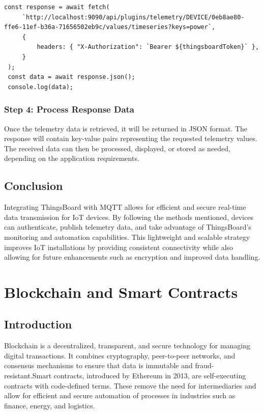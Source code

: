\documentclass[a4paper,12pt]{report}
\begin{document}
 \begin{lstlisting}[caption={Fetching Data from ThingsBoard using Token Authentication method}]
 const response = await fetch( 
     `http://localhost:9090/api/plugins/telemetry/DEVICE/0eb8ae80-ffe6-11ef-b36a-71656502eb9c/values/timeseries?keys=power`,
     {
         headers: { "X-Authorization": `Bearer ${thingsboardToken}` },
     }
 );
 const data = await response.json();
 console.log(data);
 \end{lstlisting}
 
 \subsection{Step 4: Process Response Data}
 Once the telemetry data is retrieved, it will be returned in JSON format. The response will contain key-value pairs representing the requested telemetry values. The received data can then be processed, displayed, or stored as needed, depending on the application requirements.
 \section{Conclusion}
 Integrating ThingsBoard with MQTT allows for efficient and secure real-time data transmission for IoT devices. By following the methods mentioned, devices can authenticate, publish telemetry data, and take advantage of ThingsBoard's monitoring and automation capabilities. This lightweight and scalable strategy improves IoT installations by providing consistent connectivity while also allowing for future enhancements such as encryption and improved data handling.

 \chapter{Blockchain and Smart Contracts}

 \section{Introduction}
 Blockchain is a decentralized, transparent, and secure technology for managing digital transactions. It combines cryptography, peer-to-peer networks, and consensus mechanisms to ensure that data is immutable and fraud-resistant\cite{tern2021survey}.Smart contracts, introduced by Ethereum in 2013, are self-executing contracts with code-defined terms. These remove the need for intermediaries and allow for efficient and secure automation of processes in industries such as finance, energy, and logistics\cite{johari2021smart}.
 
\end{document}
